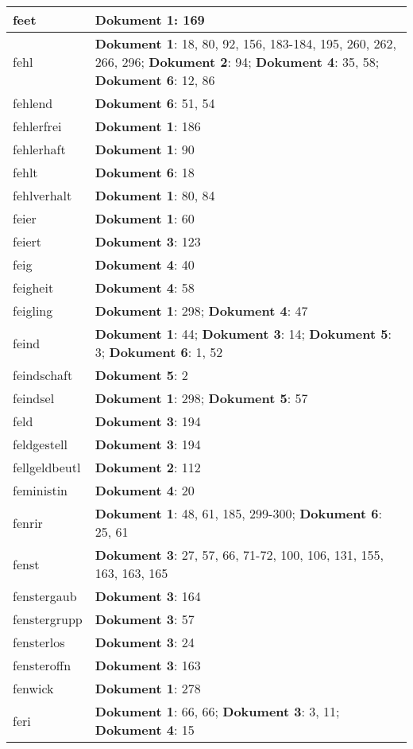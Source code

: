 \documentclass[a5paper]{article}
\begin{document}
\begin{longtable}[l]{|l|p{3in}|}
\hline
feet & \textbf{Dokument 1}: 169 \\
\hline
fehl & \textbf{Dokument 1}: 18, 80, 92, 156, 183-184, 195, 260, 262, 266, 296; \textbf{Dokument 2}: 94; \textbf{Dokument 4}: 35, 58; \textbf{Dokument 6}: 12, 86 \\
\hline
fehlend & \textbf{Dokument 6}: 51, 54 \\
\hline
fehlerfrei & \textbf{Dokument 1}: 186 \\
\hline
fehlerhaft & \textbf{Dokument 1}: 90 \\
\hline
fehlt & \textbf{Dokument 6}: 18 \\
\hline
fehlverhalt & \textbf{Dokument 1}: 80, 84 \\
\hline
feier & \textbf{Dokument 1}: 60 \\
\hline
feiert & \textbf{Dokument 3}: 123 \\
\hline
feig & \textbf{Dokument 4}: 40 \\
\hline
feigheit & \textbf{Dokument 4}: 58 \\
\hline
feigling & \textbf{Dokument 1}: 298; \textbf{Dokument 4}: 47 \\
\hline
feind & \textbf{Dokument 1}: 44; \textbf{Dokument 3}: 14; \textbf{Dokument 5}: 3; \textbf{Dokument 6}: 1, 52 \\
\hline
feindschaft & \textbf{Dokument 5}: 2 \\
\hline
feindsel & \textbf{Dokument 1}: 298; \textbf{Dokument 5}: 57 \\
\hline
feld & \textbf{Dokument 3}: 194 \\
\hline
feldgestell & \textbf{Dokument 3}: 194 \\
\hline
fellgeldbeutl & \textbf{Dokument 2}: 112 \\
\hline
feministin & \textbf{Dokument 4}: 20 \\
\hline
fenrir & \textbf{Dokument 1}: 48, 61, 185, 299-300; \textbf{Dokument 6}: 25, 61 \\
\hline
fenst & \textbf{Dokument 3}: 27, 57, 66, 71-72, 100, 106, 131, 155, 163, 163, 165 \\
\hline
fenstergaub & \textbf{Dokument 3}: 164 \\
\hline
fenstergrupp & \textbf{Dokument 3}: 57 \\
\hline
fensterlos & \textbf{Dokument 3}: 24 \\
\hline
fensteroffn & \textbf{Dokument 3}: 163 \\
\hline
fenwick & \textbf{Dokument 1}: 278 \\
\hline
feri & \textbf{Dokument 1}: 66, 66; \textbf{Dokument 3}: 3, 11; \textbf{Dokument 4}: 15 \\

\end{longtable}
\end{document}
